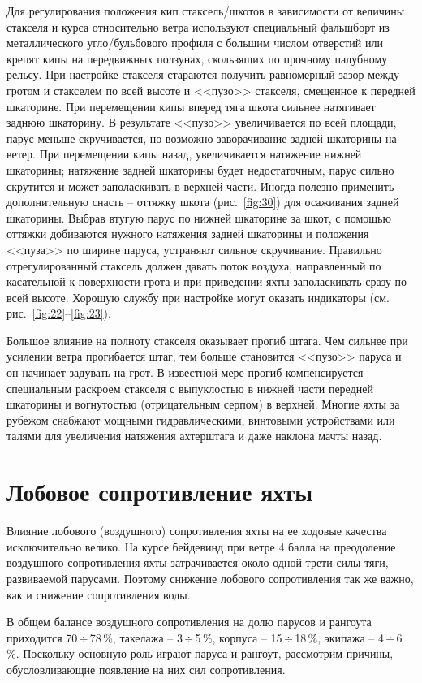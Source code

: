 \documentclass[a4paper, 12pt, twoside, final, book, russian, fittopage, cyremdash]{ncc}
\newcommand{\otdo}{\,\ensuremath{\div}\,}
\newcommand{\ris}[1]{\ref{fig:#1}}
\begin{document}
Для регулирования положения кип стаксель\-/шкотов в зависимости от величины стакселя и курса относительно ветра используют специальный фальшборт из металлического угло\-/бульбового профиля с большим числом отверстий или крепят кипы на передвижных ползунах, скользящих по прочному палубному рельсу. При настройке стакселя стараются получить равномерный зазор между гротом и стакселем по всей высоте и <<пузо>> стакселя, смещенное к передней шкаторине. При перемещении кипы вперед тяга шкота сильнее натягивает заднюю шкаторину. В результате <<пузо>> увеличивается по всей площади, парус меньше скручивается, но возможно заворачивание задней шкаторины на ветер. При перемещении кипы назад, увеличивается натяжение нижней шкаторины; натяжение задней шкаторины будет недостаточным, парус сильно скрутится и может заполаскивать в верхней части. Иногда полезно применить дополнительную снасть \--- оттяжку шкота (рис.~\ris{30}) для осаживания задней шкаторины. Выбрав втугую парус по нижней шкаторине за шкот, с помощью оттяжки добиваются нужного натяжения задней шкаторины и положения <<пуза>> по ширине паруса, устраняют сильное скручивание. Правильно отрегулированный стаксель должен давать поток воздуха, направленный по касательной к поверхности грота и при приведении яхты заполаскивать сразу по всей высоте. Хорошую службу при настройке могут оказать индикаторы (см. рис.~\ris{22}--\ris{23}).

Большое влияние на полноту стакселя оказывает прогиб штага. Чем сильнее при усилении ветра прогибается штаг, тем больше становится <<пузо>> паруса и он начинает задувать на грот. В известной мере прогиб компенсируется специальным раскроем стакселя с выпуклостью в нижней части передней шкаторины и вогнутостью (отрицательным серпом) в верхней. Многие яхты за рубежом снабжают мощными гидравлическими, винтовыми устройствами или талями для увеличения натяжения ахтерштага и даже наклона мачты назад.

\section{Лобовое сопротивление яхты}

Влияние лобового (воздушного) сопротивления яхты на ее ходовые качества исключительно велико. На курсе бейдевинд при ветре 4 балла на преодоление воздушного сопротивления яхты затрачивается около одной трети силы тяги, развиваемой парусами. Поэтому снижение лобового сопротивления так же важно, как и снижение сопротивления воды.

В общем балансе воздушного сопротивления на долю парусов и рангоута приходится 70\otdo 78\,\%, такелажа \--- 3\otdo 5\,\%, корпуса \--- 15\otdo 18\,\%, экипажа \--- 4\otdo 6\,\%. Поскольку основную роль играют паруса и рангоут, рассмотрим причины, обусловливающие появление на них сил сопротивления.
\end{document}
